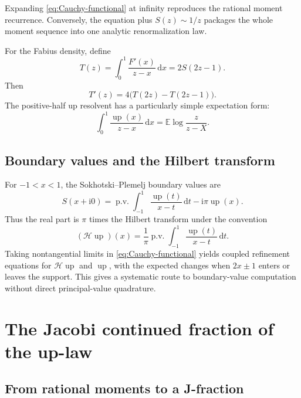 \documentclass[11pt,oneside]{article}
\numberwithin{equation}{section}
\theoremstyle{definition}
\theoremstyle{remark}
\newcommand{\Up}{\operatorname{up}}
\newcommand{\ii}{\mathrm i}
\newcommand{\dd}{\,\mathrm d}
\newcommand{\E}{\mathbb E}
\newcommand{\pv}{\operatorname{p.v.}}
\begin{document}
Expanding \eqref{eq:Cauchy-functional} at infinity reproduces the rational
moment recurrence.  Conversely, the equation plus \(S(z)\sim1/z\) packages the
whole moment sequence into one analytic renormalization law.

For the Fabius density, define
\begin{equation}
 T(z)=\int_0^1\frac{F'(x)}{z-x}\dd x=2S(2z-1).
 \label{eq:F-density-Cauchy}
\end{equation}
Then
\begin{equation}
 T'(z)=4\bigl(T(2z)-T(2z-1)\bigr).
 \label{eq:F-density-Cauchy-functional}
\end{equation}
The positive-half up resolvent has a particularly simple expectation form:
\begin{equation}
 \boxed{
 \int_0^1\frac{\Up(x)}{z-x}\dd x
 =\E\log\frac{z}{z-X}.}
 \label{eq:half-resolvent-log}
\end{equation}

\subsection{Boundary values and the Hilbert transform}

For \(-1<x<1\), the Sokhotski--Plemelj boundary values are
\begin{equation}
 S(x+\ii0)
 =\pv\int_{-1}^1\frac{\Up(t)}{x-t}\dd t-\ii\pi\Up(x).
 \label{eq:Plemelj}
\end{equation}
Thus the real part is \(\pi\) times the Hilbert transform under the convention
\begin{equation}
 (\mathcal H\Up)(x)=\frac1\pi\pv\int_{-1}^1\frac{\Up(t)}{x-t}\dd t.
 \label{eq:Hilbert-def}
\end{equation}
Taking nontangential limits in \eqref{eq:Cauchy-functional} yields coupled
refinement equations for \(\mathcal H\Up\) and \(\Up\), with the expected
changes when \(2x\pm1\) enters or leaves the support.  This gives a systematic
route to boundary-value computation without direct principal-value quadrature.

\section{The Jacobi continued fraction of the up-law}
\label{sec:jacobi}

\subsection{From rational moments to a J-fraction}
\end{document}
